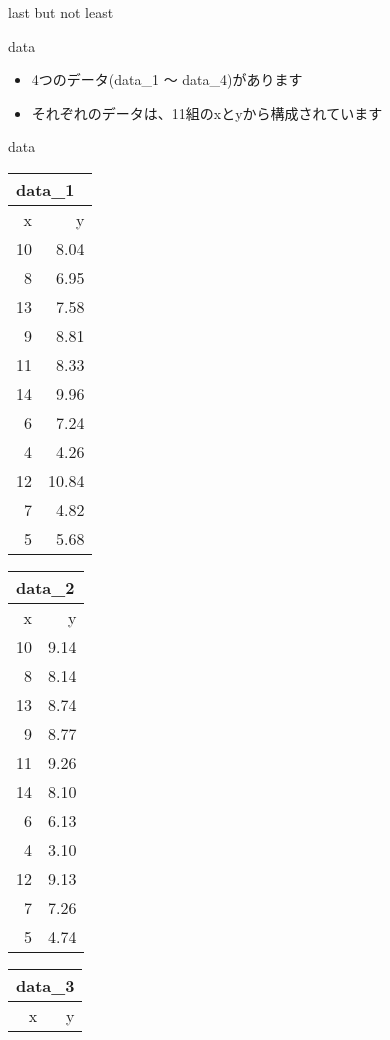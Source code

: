 \documentclass[
  ignorenonframetext,
]{beamer}
\begin{document}
\begin{frame}{last but not least}
\protect\hypertarget{last-but-not-least}{}
\end{frame}

\begin{frame}{data}
\protect\hypertarget{data}{}
\begin{itemize}[<+->]
\item
  4つのデータ(data\_1 ～ data\_4)があります
\item
  それぞれのデータは、11組のxとyから構成されています
\end{itemize}
\end{frame}

\begin{frame}{data}
\protect\hypertarget{data-1}{}
\begin{tabular}{rr}
\multicolumn{2}{l}{data\_1}\\
\toprule
x & y\\
\midrule
10 & 8.04\\
8 & 6.95\\
13 & 7.58\\
9 & 8.81\\
11 & 8.33\\
14 & 9.96\\
6 & 7.24\\
4 & 4.26\\
12 & 10.84\\
7 & 4.82\\
5 & 5.68\\
\bottomrule
\end{tabular}\hfill
\begin{tabular}{rr}
\multicolumn{2}{l}{data\_2}\\
\toprule
x & y\\
\midrule
10 & 9.14\\
8 & 8.14\\
13 & 8.74\\
9 & 8.77\\
11 & 9.26\\
14 & 8.10\\
6 & 6.13\\
4 & 3.10\\
12 & 9.13\\
7 & 7.26\\
5 & 4.74\\
\bottomrule
\end{tabular}\hfill
\begin{tabular}{rr}
\multicolumn{2}{l}{data\_3}\\
\toprule
x & y\\

\end{tabular}
\end{frame}
\end{document}
